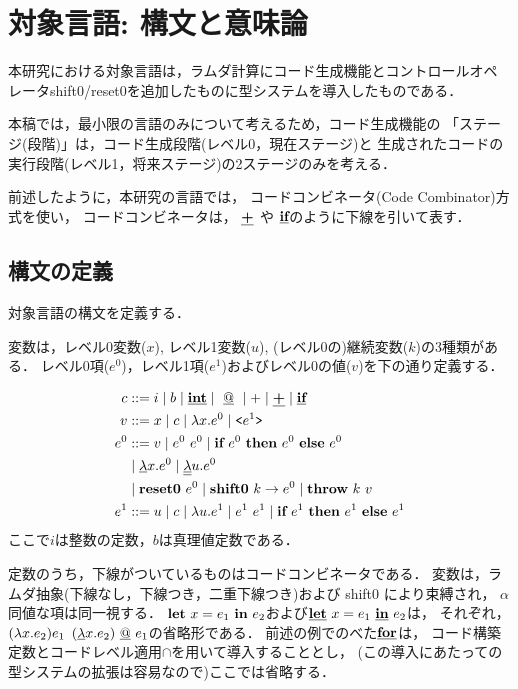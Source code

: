 
\section{対象言語: 構文と意味論}

本研究における対象言語は，ラムダ計算にコード生成機能とコントロールオペ
レータshift0/reset0を追加したものに型システムを導入したものである．

本稿では，最小限の言語のみについて考えるため，コード生成機能の
「ステージ(段階)」は，コード生成段階(レベル0，現在ステージ)と
生成されたコードの実行段階(レベル1，将来ステージ)の2ステージのみを考える．

前述したように，本研究の言語では，
コードコンビネータ(Code Combinator)方式を使い，
コードコンビネータは，
$\underline{\textbf{+}}$ や $\underline{\textbf{if}}$のように下線を引いて表す．

\subsection{構文の定義}

対象言語の構文を定義する．

変数は，レベル0変数($x$), レベル1変数($u$),
(レベル0の)継続変数($k$)の3種類がある．
レベル0項($e^0$)，レベル1項($e^1$)およびレベル0の値($v$)を下の通り定義する．

\begin{align*}
  c & ::= i \mid b \mid \underline{\textbf{int}}
         \mid ~\underline{@}~ \mid + \mid \underline{\textbf{+}} \mid \underline{\textbf{if}} \\
  v & ::= x \mid c \mid \lambda{x}.{e^0} \mid \texttt{<}{e^1}\texttt{>} \\
  e^0 & ::=  v  \mid e^0~ e^0 \mid \textbf{if}~{e^0}~\textbf{then}~{e^0}~\textbf{else}~{e^0} \\
    & \mid \underline{\lambda}{x}.{e^0}
      \mid \underline{\underline{\lambda}}{u}.{e^0} \\
    & \mid \textbf{reset0}~{e^0}
      \mid \textbf{shift0}~{k}\to{e^0}
      \mid \textbf{throw}~{k}~{v} \\
  e^1 & ::=  u \mid c \mid \lambda{u}.{e^1} \mid e^1~ e^1
      \mid \textbf{if}~{e^1}~\textbf{then}~{e^1}~\textbf{else}~{e^1} \\
\end{align*}
ここで$i$は整数の定数，$b$は真理値定数である．

定数のうち，下線がついているものはコードコンビネータである．
変数は，ラムダ抽象(下線なし，下線つき，二重下線つき)および shift0 により束縛され，
$\alpha$同値な項は同一視する．
$\textbf{let}~{x}={e_1}~\textbf{in}~{e_2}$および$\underline{\textbf{let}}~{x}={e_1}~\underline{\textbf{in}}~{e_2}$は，
それぞれ，$(\lambda{x}.{e_2})e_1$
$(\underline{\lambda}{x}.{e_2})~\underline{@}~ e_1$の省略形である．
前述の例でのべた$\underline{\textbf{for}}$は，
コード構築定数とコードレベル適用$\cap$を用いて導入することとし，
(この導入にあたっての型システムの拡張は容易なので)ここでは省略する．

